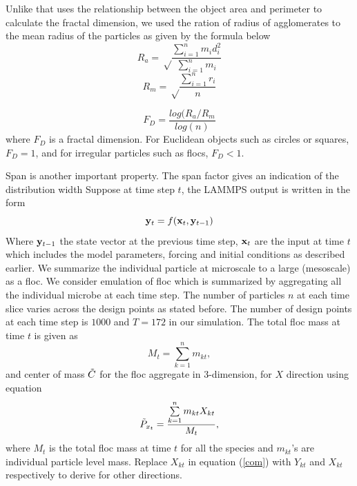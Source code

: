 Unlike \citet{co7} that uses the relationship between the object area and perimeter to calculate the fractal dimension, we used the ration of radius of agglomerates to the mean radius of the particles as given by the formula below
\begin{equation}
R_a=\sqrt \frac{\sum \limits_{i=1}^n m_i d_i^2}{\sum \limits_{i=1}^n m_i}
\end{equation} 
\begin{equation}
R_m=\sqrt \frac{\sum \limits_{i=1}^n r_i}{n}
\end{equation} 

\begin{equation}
F_D=\frac{log(R_a/R_m}{log(n)}
\end{equation} 
where $F_D$ is a fractal dimension. For Euclidean objects such as circles or squares, $F_D=1$, and for irregular particles such as flocs, $F_D<1$.

Span is another important property. The span factor gives an
indication of the distribution width
Suppose at time step $t$, the LAMMPS output is written in the form 
\begin{equation}
{\bf y}_t=f({\bf x}_t,{\bf y}_{t-1})
\end{equation}
Where ${\bf y}_{t-1}$ the state vector at the previous time step, ${\bf x}_t$ are the input at time $t$ which includes the model parameters, forcing and initial conditions as described earlier. We summarize the individual particle at microscale to a large (mesoscale) as a floc. We consider emulation of floc which is summarized by aggregating all the individual microbe at each time step. The number of particles $n$ at each time slice varies across the design points as stated before. The number of design points at each time step is $1000$ and $T=172$ in our simulation. The total floc mass at time $t$ is given as
\begin{equation}
M_t =\sum \limits^n_{k=1} m_{kt},
\end{equation} 
and center of mass ${\tilde {C}}$ for the floc aggregate in 3-dimension, for $X$ direction using equation 
\begin{equation}\label{com}
{\tilde {P}}_{x_t}=\frac{\sum \limits^n_{k=1} m_{kt} X_{kt}}{M_t},
\end{equation}
where $M_t$ is the total floc mass at time $t$ for all the species and $m_{kt}$'s are individual particle level mass. Replace $X_{kt}$ in equation (\ref{com}) with $Y_{kt}$ and $X_{kt}$ respectively to derive for other directions.

